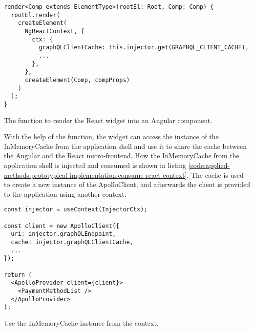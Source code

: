 \ifshowListings
\begin{listing}[H]
    \begin{verbatim}
render<Comp extends ElementType>(rootEl: Root, Comp: Comp) {
  rootEl.render(
    createElement(
      NgReactContext, {
        ctx: {
          graphQLClientCache: this.injector.get(GRAPHQL_CLIENT_CACHE),
          ...
        },
      },
      createElement(Comp, compProps)
    )
  );
}
    \end{verbatim}
    \caption{The function to render the React widget into an Angular component.}\label{code:applied-methods:prototypical-implementation:render-react-component-with-context}
\end{listing}
\fi

\noindent With the help of the function, the widget can access the instance of the InMemoryCache from the application shell and use it to share the cache between the Angular and the React micro-frontend. How the InMemoryCache from the application shell is injected and consumed is shown in listing \ref{code:applied-methods:prototypical-implementation:consume-react-context}. The cache is used to create a new instance of the ApolloClient, and afterwards the client is provided to the application using another context.

\ifshowListings
\begin{listing}[H]
    \begin{verbatim}
const injector = useContext(InjectorCtx);

const client = new ApolloClient({
  uri: injector.graphQLEndpoint,
  cache: injector.graphQLClientCache,
  ...
});

return (
  <ApolloProvider client={client}>
    <PaymentMethodList />
  </ApolloProvider>
);

    \end{verbatim}
    \caption{Use the InMemoryCache instance from the context.}\label{code:applied-methods:prototypical-implementation:consume-react-context}
\end{listing}
\fi
